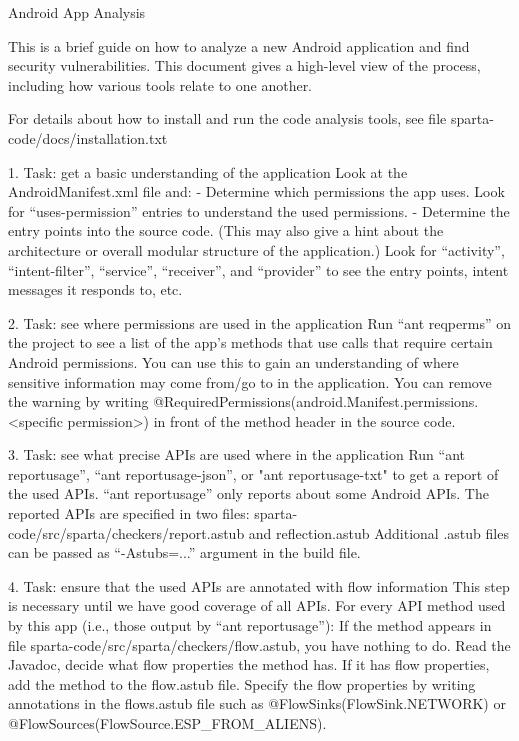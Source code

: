 Android App Analysis

This is a brief guide on how to analyze a new Android application and
find security vulnerabilities. This document gives a high-level view
of the process, including how various tools relate to one another.

For details about how to install and run the code analysis tools, see file
sparta-code/docs/installation.txt


1. Task: get a basic understanding of the application
Look at the AndroidManifest.xml file and:
- Determine which permissions the app uses.
  Look for “uses-permission” entries to understand the used
  permissions.
- Determine the entry points into the source code. (This may also give
  a hint about the architecture or overall modular structure of the
  application.)
  Look for “activity”, “intent-filter”, “service”, “receiver”, and
  “provider” to see the entry points, intent messages it responds to,
  etc.


2. Task: see where permissions are used in the application
Run “ant reqperms” on the project to see a list of the app’s methods
that use calls that require certain Android permissions. You can use
this to gain an understanding of where sensitive information may come
from/go to in the application. You can remove the warning by writing
@RequiredPermissions({android.Manifest.permissions.<specific
permission>}) in front of the method header in the source code.


3. Task: see what precise APIs are used where in the application
Run “ant reportusage”, “ant reportusage-json”, or "ant
reportusage-txt" to get a report of the used APIs.
“ant reportusage” only reports about some Android APIs.
The reported APIs are specified in two files:
sparta-code/src/sparta/checkers/report.astub and reflection.astub 
Additional .astub files can be passed as “-Astubs=...” argument in the
build file.


4. Task: ensure that the used APIs are annotated with flow information
This step is necessary until we have good coverage of all APIs.
For every API method used by this app (i.e., those output by “ant
reportusage”):
If the method appears in file
sparta-code/src/sparta/checkers/flow.astub, you have nothing to do.
Read the Javadoc, decide what flow properties the method has.
If it has flow properties, add the method to the flow.astub file.
Specify the flow properties by writing annotations in the flows.astub
file such as @FlowSinks(FlowSink.NETWORK) or
@FlowSources(FlowSource.ESP_FROM_ALIENS).

